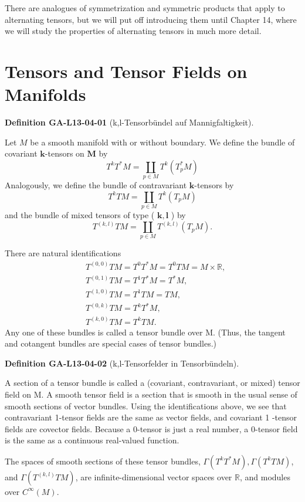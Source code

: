 \documentclass[10pt, letterpaper]{article}
\newcommand{\CustomHeading}[3]{%
  \par\medskip\noindent%
  \textbf{#1 #2} \textnormal{(#3)}.\enskip%
}
\newenvironment{DEF}[2]{\begin{unitbox}\CustomHeading{Definition}{#1}{#2}}{\end{unitbox}}
\begin{document}
There are analogues of symmetrization and symmetric products that apply to alternating tensors, but we will put off introducing them until Chapter 14, where we will study the properties of alternating tensors in much more detail.



\pagebreak


\section*{Tensors and Tensor Fields on Manifolds}


\begin{DEF}{GA-L13-04-01}{k,l-Tensorbündel auf Mannigfaltigkeit}
Let $M$ be a smooth manifold with or without boundary. We define the bundle of covariant $\boldsymbol{k}$-tensors on $\boldsymbol{M}$ by
$$
T^{k} T^{*} M=\coprod_{p \in M} T^{k}\left(T_{p}^{*} M\right)
$$
Analogously, we define the bundle of contravariant $\boldsymbol{k}$-tensors by
$$
T^{k} T M=\coprod_{p \in M} T^{k}\left(T_{p} M\right)
$$
and the bundle of mixed tensors of type ( $\boldsymbol{k}, \boldsymbol{l}$ ) by
$$
T^{(k, l)} T M=\coprod_{p \in M} T^{(k, l)}\left(T_{p} M\right) .
$$

There are natural identifications
$$
\begin{aligned}
& T^{(0,0)} T M=T^{0} T^{*} M=T^{0} T M=M \times \mathbb{R}, \\
& T^{(0,1)} T M=T^{1} T^{*} M=T^{*} M, \\
& T^{(1,0)} T M=T^{1} T M=T M, \\
& T^{(0, k)} T M=T^{k} T^{*} M, \\
& T^{(k, 0)} T M=T^{k} T M .
\end{aligned}
$$
Any one of these bundles is called a tensor bundle over M. (Thus, the tangent and cotangent bundles are special cases of tensor bundles.)
\end{DEF}


\begin{DEF}{GA-L13-04-02}{k,l-Tensorfelder in Tensorbündeln}
A section of a tensor bundle is called a (covariant, contravariant, or mixed) tensor field on M. A smooth tensor field is a section that is smooth in the usual sense of smooth sections of vector bundles. Using the identifications above, we see that contravariant 1-tensor fields are the same as vector fields, and covariant 1 -tensor fields are covector fields. Because a 0-tensor is just a real number, a 0-tensor field is the same as a continuous real-valued function.

The spaces of smooth sections of these tensor bundles, $\Gamma\left(T^{k} T^{*} M\right), \Gamma\left(T^{k} T M\right)$, and $\Gamma\left(T^{(k, l)} T M\right)$, are infinite-dimensional vector spaces over $\mathbb{R}$, and modules over $C^{\infty}(M)$.
\end{DEF}
\end{document}
